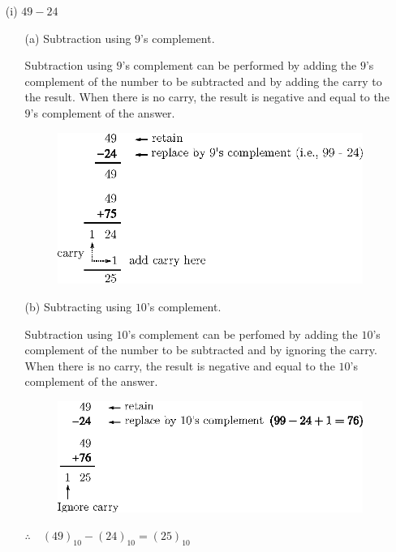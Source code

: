 \begin{solution}
\begin{itemize}
\item[(i)] $49-24$
\begin{itemize}
\item[(a)] Subtraction using $9$'s complement.

Subtraction using $9$'s complement can be performed by adding the $9$'s complement of the number to be subtracted and by adding the carry to the result. When there is no carry, the result is negative and equal to the $9$'s complement of the answer.
\begin{figure}[H]
\centering
\includegraphics{chap6/fig54.eps}
\end{figure}

\eject

\item[(b)] Subtracting using $10$'s complement.

Subtraction using $10$'s complement can be perfomed by adding the $10$'s complement of the number to be subtracted and by ignoring the carry. When there is no carry, the result is negative and equal to the $10$'s complement of the answer.
\begin{figure}[H]
\centering
\includegraphics{chap6/fig55.eps}
\end{figure}
$\therefore\quad (49)_{10}-(24)_{10}=(25)_{10}$
\end{itemize}


\end{itemize}
\end{solution}
